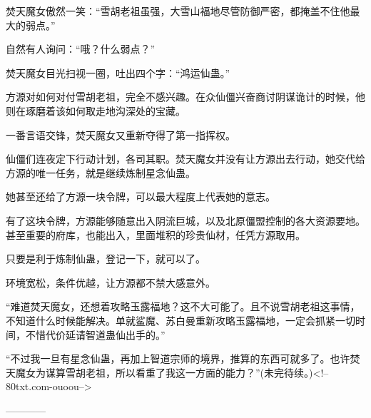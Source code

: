 \begin{this_body}
焚天魔女傲然一笑：“雪胡老祖虽强，大雪山福地尽管防御严密，都掩盖不住他最大的弱点。”

自然有人询问：“哦？什么弱点？”

焚天魔女目光扫视一圈，吐出四个字：“鸿运仙蛊。”

方源对如何对付雪胡老祖，完全不感兴趣。在众仙僵兴奋商讨阴谋诡计的时候，他则在琢磨着该如何取走地沟深处的宝藏。

一番言语交锋，焚天魔女又重新夺得了第一指挥权。

仙僵们连夜定下行动计划，各司其职。焚天魔女并没有让方源出去行动，她交代给方源的唯一任务，就是继续炼制星念仙蛊。

她甚至还给了方源一块令牌，可以最大程度上代表她的意志。

有了这块令牌，方源能够随意出入阴流巨城，以及北原僵盟控制的各大资源要地。甚至重要的府库，也能出入，里面堆积的珍贵仙材，任凭方源取用。

只要是利于炼制仙蛊，登记一下，就可以了。

环境宽松，条件优越，让方源都不禁大感意外。

“难道焚天魔女，还想着攻略玉露福地？这不大可能了。且不说雪胡老祖这事情，不知道什么时候能解决。单就鲨魔、苏白曼重新攻略玉露福地，一定会抓紧一切时间，不惜代价延请智道蛊仙出手的。”

“不过我一旦有星念仙蛊，再加上智道宗师的境界，推算的东西可就多了。也许焚天魔女为谋算雪胡老祖，所以看重了我这一方面的能力？”(未完待续。)<!--80txt.com-ouoou-->

------------

\end{this_body}

